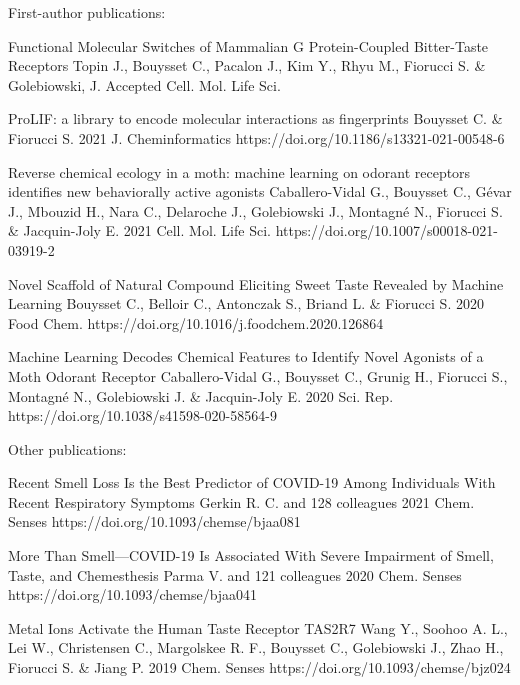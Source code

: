 
\begin{cvpublications}{First-author publications:}

	{Functional Molecular Switches of Mammalian G Protein-Coupled Bitter-Taste Receptors}
	{Topin J., Bouysset C., Pacalon J., Kim Y., Rhyu M., Fiorucci S. \& Golebiowski, J.}
	{Accepted}
    {Cell. Mol. Life Sci.}
    {}

	{ProLIF: a library to encode molecular interactions as fingerprints}
	{Bouysset C. \& Fiorucci S.}
	{2021}
    {J. Cheminformatics}
    {https://doi.org/10.1186/s13321-021-00548-6}

	{Reverse chemical ecology in a moth: machine learning on odorant receptors identifies new behaviorally active agonists}
	{Caballero-Vidal G., Bouysset C., Gévar J., Mbouzid H., Nara C., Delaroche J., Golebiowski J., Montagné N., Fiorucci S. \& Jacquin-Joly E.}
	{2021}
    {Cell. Mol. Life Sci.}
	{https://doi.org/10.1007/s00018-021-03919-2}

	{Novel Scaffold of Natural Compound Eliciting Sweet Taste Revealed by Machine Learning}
	{Bouysset C., Belloir C., Antonczak S., Briand L. \& Fiorucci S.}
	{2020}
	{Food Chem.}
	{https://doi.org/10.1016/j.foodchem.2020.126864}

	{Machine Learning Decodes Chemical Features to Identify Novel Agonists of a Moth Odorant Receptor}
	{Caballero-Vidal G., Bouysset C., Grunig H., Fiorucci S., Montagné N., Golebiowski J. \& Jacquin-Joly E.}
	{2020}
	{Sci. Rep.}
	{https://doi.org/10.1038/s41598-020-58564-9}

\end{cvpublications}

\begin{cvpublications}{Other publications:}

	{Recent Smell Loss Is the Best Predictor of COVID-19 Among Individuals With Recent Respiratory Symptoms}
	{Gerkin R. C. and 128 colleagues}
    {2021}
	{Chem. Senses}
    {https://doi.org/10.1093/chemse/bjaa081}

	{More Than Smell—COVID-19 Is Associated With Severe Impairment of Smell, Taste, and Chemesthesis}
	{Parma V. and 121 colleagues}
    {2020}
	{Chem. Senses}
    {https://doi.org/10.1093/chemse/bjaa041}

	{Metal Ions Activate the Human Taste Receptor TAS2R7}
	{Wang Y., Soohoo A. L., Lei W., Christensen C., Margolskee R. F., Bouysset C., Golebiowski J., Zhao H., Fiorucci S. \& Jiang P.}
    {2019}
	{Chem. Senses}
    {https://doi.org/10.1093/chemse/bjz024}

\end{cvpublications}

